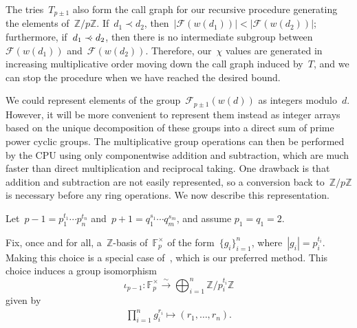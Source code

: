\documentclass{article}
\newcommand{\precdot}{\prec\mathrel{\mkern-3mu}\mathrel{\cdot}}
\theoremstyle{definition}
\theoremstyle{remark}
\begin{document}
The tries~$T_{p \pm 1}$ also form the call graph for our recursive procedure generating the elements of~$\mathbb{Z} / p\mathbb{Z}$.
If~$d_1 \prec d_2$, then~$|\mathcal{F}(w(d_1))| < |\mathcal{F}(w(d_2))|$; furthermore, if~$d_1 \precdot d_2$, then there is no intermediate subgroup between~$\mathcal{F}(w(d_1))$ and~$\mathcal{F}(w(d_2))$.
Therefore, our~$\chi$ values are generated in increasing multiplicative order moving down the call graph induced by~$T$, and we can stop the procedure when we have reached the desired bound.

We could represent elements of the group~$\mathcal{F}_{p \pm 1}(w(d))$ as integers modulo~$d$.
However, it will be more convenient to represent them instead as integer arrays based on the unique decomposition of these groups into a direct sum of prime power cyclic groups. 
The multiplicative group operations can then be performed by the CPU using only componentwise addition and subtraction, which are much faster than direct multiplication and reciprocal taking.
One drawback is that addition and subtraction are not easily represented, so a conversion back to~$\mathbb{Z} / p\mathbb{Z}$ is necessary before any ring operations.
We now describe this representation.

Let~$p - 1 = p_1^{t_1} \cdots p_n^{t_n}$ and~$p + 1 = q_1^{s_1} \cdots q_m^{s_m}$, and assume $p_1 = q_1 = 2$.

Fix, once and for all, a~$\mathbb{Z}$-basis of~$\mathbb{F}_p^\times$ of the form~$\{g_i\}_{i=1}^n$, where~$|g_i| = p_i^{t_i}$.
Making this choice is a special case of~\cite[Algorithm 6.1]{generators}, which is our preferred method.
This choice induces a group isomorphism
\[ \iota_{p - 1} : \mathbb{F}_p^\times \xrightarrow{\sim} \bigoplus_{i = 1}^n \mathbb{Z} / p_i^{t_i} \mathbb{Z} \]
given by
\begin{align}
    \prod_{i=1}^n g_i^{r_i} \mapsto (r_1,\ldots,r_n). \label{eq:generators}
\end{align}
\end{document}
